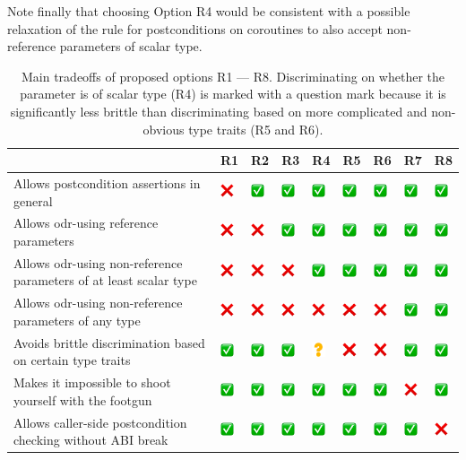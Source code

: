 Note finally that choosing Option R4 would be consistent with a possible relaxation of the rule for postconditions on coroutines to also accept non-reference parameters of scalar type.

\newcommand{\yes}{\includegraphics[width=4mm]{images/yes.png}}
\newcommand{\no}{\includegraphics[width=4mm]{images/no.png}}
\newcommand{\maybe}{\includegraphics[width=4mm]{images/maybe.png}}
\begin{table}[b]
\begin{tabular}{|p{5.4cm}|p{0.9cm}|p{0.9cm}|p{0.9cm}|p{0.9cm}|p{0.9cm}|p{0.9cm}|p{0.9cm}|p{0.9cm}|}
\hline 
& R1 & R2 & R3 & R4 & R5 & R6 & R7 & R8 \\
\hline
Allows postcondition assertions in general & \no & \yes  & \yes  & \yes & \yes & \yes & \yes & \yes \\ \hline
Allows odr-using reference parameters & \no & \no  & \yes  & \yes & \yes & \yes & \yes & \yes \\ \hline
Allows odr-using non-reference parameters of at least scalar type& \no & \no  & \no  & \yes & \yes & \yes & \yes & \yes \\ \hline
Allows odr-using non-reference parameters of any type& \no & \no  & \no  & \no & \no & \no & \yes & \yes \\ \hline
Avoids brittle discrimination based on certain type traits& \yes & \yes  & \yes  & \maybe & \no & \no & \yes & \yes \\ \hline
Makes it impossible to shoot yourself with the footgun& \yes & \yes  & \yes  & \yes & \yes & \yes & \no & \yes \\ \hline
Allows caller-side postcondition checking without ABI break& \yes & \yes  & \yes  & \yes & \yes & \yes & \yes & \no \\ \hline
\end{tabular}
\vspace{2mm}
\caption{Main tradeoffs of proposed options R1 --- R8. Discriminating on whether the parameter is of scalar type (R4) is marked with a question mark because it is significantly less brittle than discriminating based on more complicated and non-obvious type traits (R5 and R6).}
\label{tradeoffs}
\end{table}

